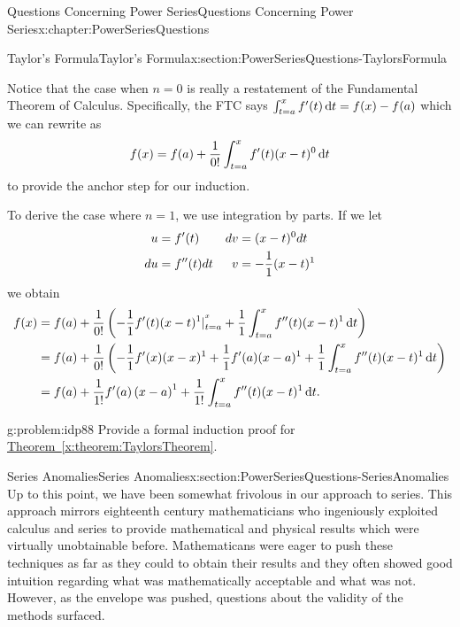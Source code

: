 \begin{chapterptx}{Questions Concerning Power Series}{}{Questions Concerning Power Series}{}{}{x:chapter:PowerSeriesQuestions}
\begin{sectionptx}{Taylor's Formula}{}{Taylor's Formula}{}{}{x:section:PowerSeriesQuestions-TaylorsFormula}
		\par
		Notice that the case when \(n=0\) is really a restatement of the Fundamental Theorem of Calculus. Specifically, the FTC says \(\int_{t=a}^xf^\prime(t)\,{\rm d} t=f(x)-f(a)\) which we can rewrite as%
		\begin{equation*}
			f(x)=f(a)+\frac{1}{0!}\int_{t=a}^xf^\prime(t)(x-t)^0\,{\rm d} t
		\end{equation*}
		to provide the anchor step for our induction.%
		\par
		To derive the case where \(n=1\), we use integration by parts. If we let%
		\begin{align*}
			u& =f^\prime(t)&  d v& =(x-t)^0d t\\
			d u& =f^{\prime\prime}(t)d t&  v& =-\frac{1}{1}(x-t)^1
		\end{align*}
		we obtain%
		\begin{align*}
			f(x)& =f(a)+\frac{1}{0!}\left(-\frac{1}{1}f^\prime(t)(x-t)^1|_{t=a}^{^x}+\frac{1}{1} \int_{t=a}^xf^{\prime\prime}(t)(x-t)^1\,{\rm d} t\right)\\
			& =f(a)+\frac{1}{0!}\left(-\frac{1}{1}f^\prime(x)(x-x)^1+ \frac{1}{1}f^\prime(a)(x-a)^1+\frac{1}{1}\int_{t=a}^xf^{\prime\prime}(t)(x-t)^1\,{\rm d} t\right)\\
			& =f(a)+\frac{1}{1!}f^\prime(a)\left(x-a\right)^1 + \frac{1}{1!}\int_{t=a}^xf^{\prime\prime}(t)(x-t)^1\,{\rm d} t\text{.}
		\end{align*}
		\begin{problem}{}{g:problem:idp88}%
			 Provide a formal induction proof for \hyperref[x:theorem:TaylorsTheorem]{Theorem~{\xreffont\ref{x:theorem:TaylorsTheorem}}}.%
		\end{problem}
	\end{sectionptx}
	\typeout{************************************************}
	\typeout{************************************************}
	\begin{sectionptx}{Series Anomalies}{}{Series Anomalies}{}{}{x:section:PowerSeriesQuestions-SeriesAnomalies}
		Up to this point, we have been somewhat frivolous in our approach to series. This approach mirrors eighteenth century mathematicians who ingeniously exploited calculus and series to provide mathematical and physical results which were virtually unobtainable before. Mathematicans were eager to push these techniques as far as they could to obtain their results and they often showed good intuition regarding what was mathematically acceptable and what was not. However, as the envelope was pushed, questions about the validity of the methods surfaced.%

\end{sectionptx}
\end{chapterptx}
